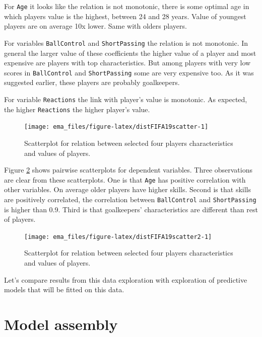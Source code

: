 \documentclass[]{krantz}
\begin{document}
For \texttt{Age} it looks like the relation is not monotonic, there is some optimal age in which players value is the highest, between 24 and 28 years. Value of youngest players are on average 10x lower. Same with olders players.

For variables \texttt{BallControl} and \texttt{ShortPassing} the relation is not monotonic. In general the larger value of these coefficients the higher value of a player and most expensive are players with top characteristics. But among players with very low scores in \texttt{BallControl} and \texttt{ShortPassing} some are very expensive too. As it was suggested earlier, these players are probably goalkeepers.

For variable \texttt{Reactions} the link with player's value is monotonic. As expected, the higher \texttt{Reactions} the higher player's value.

\begin{figure}

{\centering \texttt{[image: ema\_files/figure-latex/distFIFA19scatter-1]} 

}

\caption{Scatterplot for relation between selected four players characteristics and values of players.}\label{fig:distFIFA19scatter}
\end{figure}

Figure \ref{fig:distFIFA19scatter2} shows pairwise scatterplots for dependent variables. Three observations are clear from these scatterplots. One is that \texttt{Age} has positive correlation with other variables. On average older players have higher skills. Second is that skills are positively correlated, the correlation between \texttt{BallControl} and \texttt{ShortPassing} is higher than 0.9. Third is that goalkeepers' characteristics are different than rest of players.

\begin{figure}

{\centering \texttt{[image: ema\_files/figure-latex/distFIFA19scatter2-1]} 

}

\caption{Scatterplot for relation between selected four players characteristics and values of players.}\label{fig:distFIFA19scatter2}
\end{figure}

Let's compare results from this data exploration with exploration of predictive models that will be fitted on this data.

\hypertarget{model-assembly}{%
\section{Model assembly}\label{model-assembly}}
\end{document}
